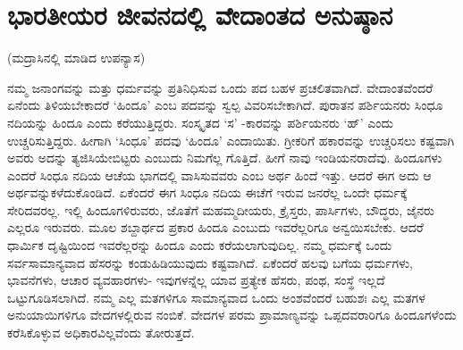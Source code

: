 
\chapter{ಭಾರತೀಯರ ಜೀವನದಲ್ಲಿ ವೇದಾಂತದ ಅನುಷ್ಠಾನ}

\begin{center}
(ಮದ್ರಾಸಿನಲ್ಲಿ ಮಾಡಿದ ಉಪನ್ಯಾಸ)
\end{center}

ನಮ್ಮ ಜನಾಂಗವನ್ನು ಮತ್ತು ಧರ್ಮವನ್ನು ಪ್ರತಿನಿಧಿಸುವ ಒಂದು ಪದ ಬಹಳ ಪ್ರಚಲಿತವಾಗಿದೆ. ವೇದಾಂತವೆಂದರೆ ಏನೆಂದು ತಿಳಿಯಬೇಕಾದರೆ ‘ಹಿಂದೂ’ ಎಂಬ ಪದವನ್ನು ಸ್ವಲ್ಪ ವಿವರಿಸಬೇಕಾಗಿದೆ. ಪುರಾತನ ಪರ್ಶಿಯನರು ಸಿಂಧೂ ನದಿಯನ್ನು ಹಿಂದೂ ಎಂದು ಕರೆಯುತ್ತಿದ್ದರು. ಸಂಸ್ಕೃತದ ‘ಸ’ -ಕಾರವನ್ನು ಪರ್ಶಿಯನರು ‘ಹ್​’ ಎಂದು ಉಚ್ಚರಿಸುತ್ತಿದ್ದರು. ಹೀಗಾಗಿ ‘ಸಿಂಧೂ’ ಪದವು ‘ಹಿಂದೂ’ ಎಂದಾಯಿತು. ಗ್ರೀಕರಿಗೆ ಹಕಾರವನ್ನು ಉಚ್ಚರಿಸಲು ಕಷ್ಟವಾಗಿ ಅವರು ಅದನ್ನು ತ್ಯಜಿಸಿಯೇಬಿಟ್ಟರು ಎಂಬುದು ನಿಮಗೆಲ್ಲ ಗೊತ್ತಿದೆ. ಹೀಗೆ ನಾವು ಇಂಡಿಯನರಾದೆವು. ಹಿಂದೂಗಳು ಎಂದರೆ ಸಿಂಧೂ ನದಿಯ ಆಚೆಯ ಭಾಗದಲ್ಲಿ ವಾಸಿಸುವವರು ಎಂಬ ಅರ್ಥ ಹಿಂದೆ ಇತ್ತು. ಆದರೆ ಈಗ ಅದು ಆ ಅರ್ಥವನ್ನುಕಳೆದುಕೊಂಡಿದೆ. ಏಕೆಂದರೆ ಈಗ ಸಿಂಧೂ ನದಿಯ ಈಚೆಗೆ ಇರುವ ಜನರೆಲ್ಲ ಒಂದೇ ಧರ್ಮಕ್ಕೆ ಸೇರಿದವರಲ್ಲ. ಇಲ್ಲಿ ಹಿಂದೂಗಳಿರುವರು, ಜೊತೆಗೆ ಮಹಮ್ಮದೀಯರು, ಕ್ರೈಸ್ತರು, ಪಾರ್ಸಿಗಳು, ಬೌದ್ಧರು, ಜೈನರು ಎಲ್ಲರೂ ಇರುವರು. ಮೂಲ ಶಬ್ದಾರ್ಥದ ಪ್ರಕಾರ ಹಿಂದೂ ಎಂಬುದು ಇವರೆಲ್ಲರಿಗೂ ಅನ್ವಯಿಸಬೇಕು. ಆದರೆ ಧಾರ್ಮಿಕ ದೃಷ್ಟಿಯಿಂದ ಇವರೆಲ್ಲರನ್ನು ಹಿಂದೂ ಎಂದು ಕರೆಯಲಾಗುವುದಿಲ್ಲ. ನಮ್ಮ ಧರ್ಮಕ್ಕೆ ಒಂದು ಸರ್ವಸಾಮಾನ್ಯವಾದ ಹೆಸರನ್ನು ಕಂಡುಹಿಡಿಯುವುದು ಕಷ್ಟವಾಗಿದೆ. ಏಕೆಂದರೆ ಹಲವು ಬಗೆಯ ಧರ್ಮಗಳು, ಭಾವನೆಗಳು, ಆಚಾರ ವ್ಯವಹಾರಗಳು- ಇವುಗಳನ್ನೆಲ್ಲ ಯಾವ ಪ್ರತ್ಯೇಕ ಹೆಸರು, ಪಂಥ, ಸಂಸ್ಥೆ ಇಲ್ಲದೆ ಒಟ್ಟುಗೂಡಿಸಲಾಗಿದೆ. ನಮ್ಮ ಎಲ್ಲ ಮತಗಳಿಗೂ ಸಾಮಾನ್ಯವಾದ ಒಂದು ಅಂಶವೆಂದರೆ ಬಹುಶಃ ಎಲ್ಲ ಮತಗಳ ಅನುಯಾಯಿಗಳಿಗೂ ವೇದಗಳಲ್ಲಿರುವ ನಂಬಿಕೆ. ವೇದಗಳ ಪರಮ ಪ್ರಾಮಾಣ್ಯವನ್ನು ಒಪ್ಪದವರಾರಿಗೂ ಹಿಂದೂಗಳೆಂದು ಕರೆಸಿಕೊಳ್ಳುವ ಅಧಿಕಾರವಿಲ್ಲವೆಂದು ತೋರುತ್ತದೆ.

\newpage


